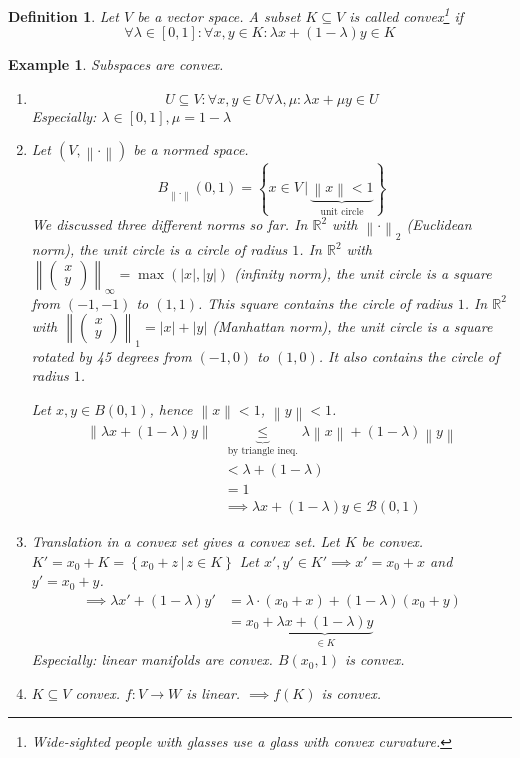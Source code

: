 \documentclass[a4paper]{article}
\newcounter{lecref}[section]
\numberwithin{lecref}{section}
\newtheorem{example}[lecref]{Example}
\newtheorem{definition}[lecref]{Definition}
\newcommand{\setdef}[2]{\left\{\left.#1\,\right|\,#2\right\}}
\newcommand{\norm}[1]{\left\|#1\right\|}
\newcommand{\card}[1]{\left|#1\right|}
\newcommand{\vectwo}[2]{\begin{pmatrix} #1 \\ #2 \end{pmatrix}}
\begin{document}
\begin{definition}
  Let $V$ be a vector space.
  A subset $K \subseteq V$ is called convex\footnote{Wide-sighted people with glasses use a glass with convex curvature.} if
  \[ \forall \lambda \in [0,1]: \forall x,y \in K: \lambda x + (1 - \lambda) y \in K \]
\end{definition}

\begin{example} %
  Subspaces are convex.
  \begin{enumerate}
    \item
      \[ U \subseteq V: \forall x, y \in U \forall \lambda, \mu: \lambda x + \mu y \in U \]
      Especially: $\lambda \in [0,1], \mu = 1 - \lambda$
    \item
      Let $(V, \norm{\cdot})$ be a normed space.
      \[ B_{\norm{\cdot}}(0,1) = \setdef{x \in V}{\underbrace{\norm{x} < 1}_{\text{unit circle}}} \]
      We discussed three different norms so far.
      In $\mathbb R^2$ with $\norm{\cdot}_2$ (Euclidean norm), the unit circle is a circle of radius $1$.
      In $\mathbb R^2$ with $\norm{\vectwo xy}_{\infty} = \max(\card{x}, \card{y})$ (infinity norm), the unit circle is a square from $(-1,-1)$ to $(1,1)$. This square contains the circle of radius $1$.
      In $\mathbb R^2$ with $\norm{\vectwo xy}_{1} = \card{x} + \card{y}$ (Manhattan norm),
      the unit circle is a square rotated by 45 degrees from $(-1, 0)$ to $(1, 0)$. It also contains the circle of radius $1$.

      Let $x, y \in B(0,1)$, hence $\norm{x} < 1$, $\norm{y} < 1$.
      \begin{align*}
        \norm{\lambda x + (1 - \lambda) y}
          &\underbrace{\leq}_{\text{by triangle ineq.}} \lambda \norm{x} + (1 - \lambda) \norm{y} \\
          &< \lambda + (1 - \lambda) \\
          &= 1 \\
          &\implies \lambda x + (1 - \lambda) y \in \mathcal B(0,1)
      \end{align*}
    \item
      Translation in a convex set gives a convex set.
      Let $K$ be convex. $K' = x_0 + K = \setdef{x_0 + z}{z \in K}$
      Let $x', y' \in K' \implies x' = x_0 + x$ and $y' = x_0 + y$.
      \begin{align*}
        \implies \lambda x' + (1 - \lambda) y' &= \lambda \cdot (x_0 + x) + (1 - \lambda)(x_0 + y) \\
          &= x_0 + \underbrace{\lambda x + (1 - \lambda) y}_{\in K}
      \end{align*}
      Especially: linear manifolds are convex.
      $B(x_0, 1)$ is convex.
    \item $K \subseteq V$ convex. $f: V \to W$ is linear. $\implies f(K)$ is convex.
  \end{enumerate}
\end{example}
\end{document}
